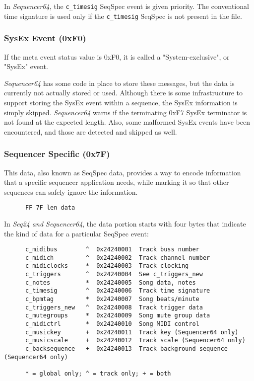    In \textsl{Sequencer64},
   the \texttt{c\_timesig} SeqSpec event is given priority.  The
   conventional time signature is used only if the \texttt{c\_timesig}
   SeqSpec is not present in the file.

\subsubsection{SysEx Event (0xF0)}
\label{subsubsec:midi_format_meta_sysex_event}

   If the meta event status value is 0xF0, it is called a "System-exclusive",
   or "SysEx" event.

   \textsl{Sequencer64} has some code in place to store these messages, but the
   data is currently not actually stored or used.  Although there is some
   infrastructure to support storing the SysEx event within a sequence, the
   SysEx information is simply skipped.  \textsl{Sequencer64} warns if the
   terminating 0xF7 SysEx terminator is not found at the expected length.
   Also, some malformed SysEx events have been encountered, and those are
   detected and skipped as well.

\subsubsection{Sequencer Specific (0x7F)}
\label{subsubsec:midi_format_meta_sequencer_specific}

   This data, also known as SeqSpec data, provides a way to encode information
   that a specific sequencer application needs, while marking it so that other
   sequences can safely ignore the information.

   \begin{verbatim}
      FF 7F len data
   \end{verbatim}

   In \textsl{Seq24 and Sequencer64},
   the data portion starts with four bytes
   that indicate the kind of data for a particular SeqSpec event:

   \begin{verbatim}
      c_midibus        ^  0x24240001  Track buss number
      c_midich         ^  0x24240002  Track channel number
      c_midiclocks     *  0x24240003  Track clocking
      c_triggers       ^  0x24240004  See c_triggers_new
      c_notes          *  0x24240005  Song data, notes
      c_timesig        ^  0x24240006  Track time signature
      c_bpmtag         *  0x24240007  Song beats/minute
      c_triggers_new   ^  0x24240008  Track trigger data
      c_mutegroups     *  0x24240009  Song mute group data
      c_midictrl       *  0x24240010  Song MIDI control
      c_musickey       +  0x24240011  Track key (Sequencer64 only)
      c_musicscale     +  0x24240012  Track scale (Sequencer64 only)
      c_backsequence   +  0x24240013  Track background sequence (Sequencer64 only)

      * = global only; ^ = track only; + = both
   \end{verbatim}

